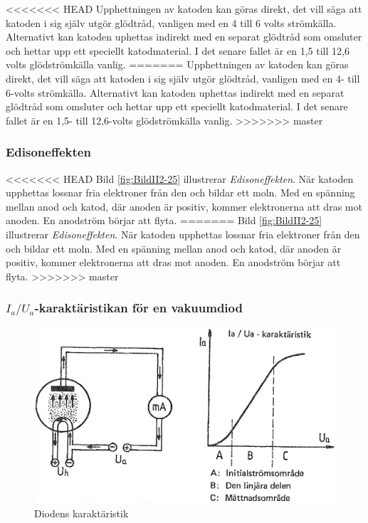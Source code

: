 <<<<<<< HEAD
Upphettningen av katoden kan göras direkt, det vill säga att katoden i
sig själv utgör glödtråd, vanligen med en 4 till 6 volts strömkälla.
Alternativt kan katoden uphettas indirekt med en separat glödtråd som
omsluter och hettar upp ett speciellt katodmaterial. I det senare
fallet är en 1,5 till 12,6 volts glödströmkälla vanlig.
=======
Upphettningen av katoden kan göras direkt, det vill säga att katoden i sig
själv utgör glödtråd, vanligen med en 4- till 6-volts strömkälla.
Alternativt kan katoden uphettas indirekt med en separat glödtråd som omsluter
och hettar upp ett speciellt katodmaterial.
I det senare fallet är en 1,5- till 12,6-volts glödströmkälla vanlig.
>>>>>>> master

\subsubsection{Edisoneffekten}


<<<<<<< HEAD
Bild \ref{fig:BildII2-25} illustrerar \emph{Edisoneffekten}. När
katoden upphettas lossnar fria elektroner från den och bildar ett
moln. Med en spänning mellan anod och katod, där anoden är positiv,
kommer elektronerna att dras mot anoden. En anodström börjar att
flyta.
=======
Bild \ref{fig:BildII2-25} illustrerar \emph{Edisoneffekten}.
När katoden upphettas lossnar fria elektroner från den och bildar ett moln.
Med en spänning mellan anod och katod, där anoden är positiv, kommer
elektronerna att dras mot anoden.
En anodström börjar att flyta.
>>>>>>> master

\subsubsection{\(I_a/U_a\)-karaktäristikan för en vakuumdiod}

\begin{figure}
\includegraphics[width=\textwidth]{images/cropped_pdfs/bild_2_2-26.pdf}
\caption{Diodens karaktäristik}
\label{fig:BildII2-26}
\end{figure}

